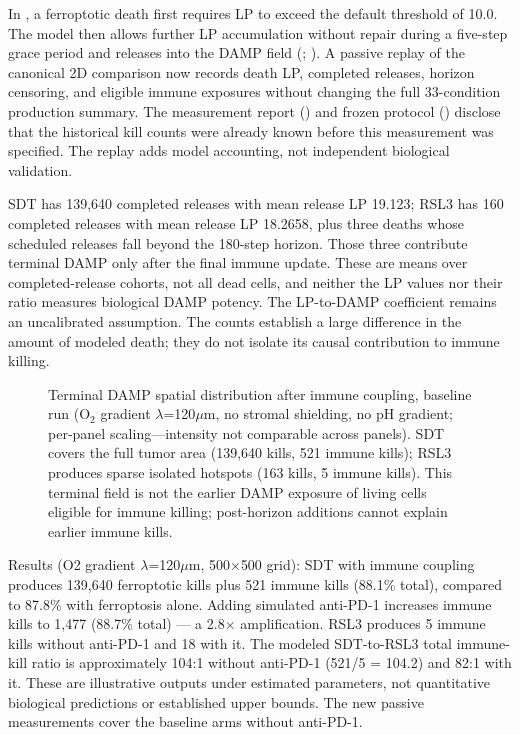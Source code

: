 \documentclass[11pt,twoside,openright]{report}
\begin{document}
In , a ferroptotic death first requires LP to exceed the default threshold of 10.0. The model then allows further LP accumulation without repair during a five-step grace period and releases  into the DAMP field (; ). A passive replay of the canonical 2D comparison now records death LP, completed releases, horizon censoring, and eligible immune exposures without changing the full 33-condition production summary. The measurement report () and frozen protocol () disclose that the historical kill counts were already known before this measurement was specified. The replay adds model accounting, not independent biological validation.

SDT has 139,640 completed releases with mean release LP 19.123; RSL3 has 160 completed releases with mean release LP 18.2658, plus three deaths whose scheduled releases fall beyond the 180-step horizon. Those three contribute terminal DAMP only after the final immune update. These are means over completed-release cohorts, not all dead cells, and neither the LP values nor their ratio measures biological DAMP potency. The LP-to-DAMP coefficient remains an uncalibrated assumption. The counts establish a large difference in the amount of modeled death; they do not isolate its causal contribution to immune killing.

\begin{figure}[tbp]
\setcounter{figure}{13}
\caption{Terminal DAMP spatial distribution after immune coupling, baseline run (O$_2$ gradient $\lambda$=120$\mu$m, no stromal shielding, no pH gradient; per-panel scaling---intensity not comparable across panels). SDT covers the full tumor area (139,640 kills, 521 immune kills); RSL3 produces sparse isolated hotspots (163 kills, 5 immune kills). This terminal field is not the earlier DAMP exposure of living cells eligible for immune killing; post-horizon additions cannot explain earlier immune kills.}
\label{fig:fig17_damp_heatmap}
\end{figure}

Results (O2 gradient $\lambda$=120$\mu$m, 500$\times$500 grid): SDT with immune coupling produces 139,640 ferroptotic kills plus 521 immune kills (88.1\% total), compared to 87.8\% with ferroptosis alone. Adding simulated anti-PD-1 increases immune kills to 1,477 (88.7\% total) --- a 2.8$\times$ amplification. RSL3 produces 5 immune kills without anti-PD-1 and 18 with it. The modeled SDT-to-RSL3 total immune-kill ratio is approximately 104:1 without anti-PD-1 (521/5 = 104.2) and 82:1 with it. These are illustrative outputs under estimated parameters, not quantitative biological predictions or established upper bounds. The new passive measurements cover the baseline arms without anti-PD-1.
\end{document}
